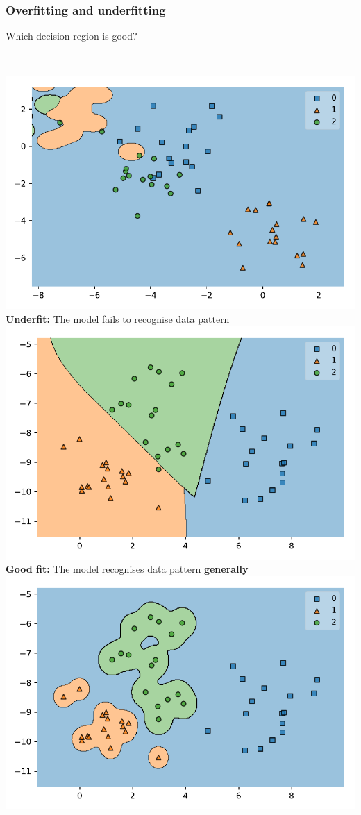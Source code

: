 \documentclass[aspectratio=169]{beamer}
\begin{document}
\begin{frame}
	\frametitle{Overfitting and underfitting}
	Which decision region is good?\\~\\
	\begin{columns}[t]
			\includegraphics[width=1.0\textwidth]{imgs/underfit.pdf}
			\textbf{Underfit: } The model fails to recognise data pattern
			\includegraphics[width=1.0\textwidth]{imgs/good.pdf}
			\textbf{Good fit: } The model recognises data pattern \textbf{generally}
			\includegraphics[width=1.0\textwidth]{imgs/overfit.pdf}

\end{columns}
\end{frame}
\end{document}
